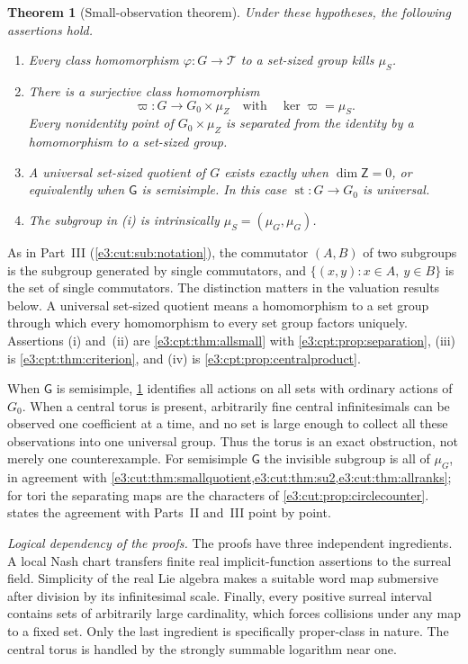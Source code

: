 \documentclass[11pt,letterpaper]{article}
\numberwithin{equation}{section}
\newtheorem{theorem}{Theorem}[section]
\theoremstyle{definition}
\theoremstyle{remark}
\newcommand{\st}{\operatorname{st}}
\newcommand{\comm}[2]{\left(#1,#2\right)}
\newcommand{\commset}[2]{\{\comm{x}{y}:x\in #1,\ y\in #2\}}
\newcommand{\sG}{\mathsf G}
\newcommand{\sZ}{\mathsf Z}
\begin{document}
\begin{theorem}[Small-observation theorem]\label{e3:cpt:thm:main-intro}
Under these hypotheses, the following assertions hold.
\begin{enumerate}[label=\textup{(\roman*)}]
\item Every class homomorphism $\varphi:G\to\mathcal T$ to a set-sized group
kills $\mu_S$.
\item There is a surjective class homomorphism
\[
 \varpi:G\longrightarrow G_0\times\mu_Z
 \quad\text{with}\quad \ker\varpi=\mu_S.
\]
Every nonidentity point of $G_0\times\mu_Z$ is separated from the identity
by a homomorphism to a set-sized group.
\item A universal set-sized quotient of $G$ exists exactly when
$\dim\sZ=0$, or equivalently when $\sG$ is semisimple. In this case
$\st:G\to G_0$ is universal.
\item The subgroup in \textup{(i)} is intrinsically
$\mu_S=\comm{\mu_G}{\mu_G}$.
\end{enumerate}
\end{theorem}

As in Part~III (\cref{e3:cut:sub:notation}), the commutator $\comm{A}{B}$ of
two subgroups is the subgroup generated by single commutators, and
$\commset{A}{B}$ is the set of single commutators. The distinction matters in
the valuation results below. A universal set-sized quotient means a
homomorphism to a set group through which every homomorphism to every set group
factors uniquely. Assertions (i) and~(ii) are \cref{e3:cpt:thm:allsmall} with
\cref{e3:cpt:prop:separation}, (iii) is \cref{e3:cpt:thm:criterion}, and (iv)
is \cref{e3:cpt:prop:centralproduct}.

When $\sG$ is semisimple, \cref{e3:cpt:thm:main-intro} identifies all actions on
all sets with ordinary actions of $G_0$. When a central torus is present,
arbitrarily fine central infinitesimals can be observed one coefficient at a
time, and no set is large enough to collect all these observations into one
universal group. Thus the torus is an exact obstruction, not merely one
counterexample. For semisimple $\sG$ the invisible subgroup is all of $\mu_G$,
in agreement with \cref{e3:cut:thm:smallquotient,e3:cut:thm:su2,e3:cut:thm:allranks};
for tori the separating maps are the characters of
\cref{e3:cut:prop:circlecounter}.  states the
agreement with Parts~II and~III point by point.

\emph{Logical dependency of the proofs.} The proofs have three independent
ingredients. A local Nash chart transfers finite real implicit-function
assertions to the surreal field. Simplicity of the real Lie algebra makes a
suitable word map submersive after division by its infinitesimal scale.
Finally, every positive surreal interval contains sets of arbitrarily large
cardinality, which forces collisions under any map to a fixed set. Only the last
ingredient is specifically proper-class in nature. The central torus is handled
by the strongly summable logarithm near one.
\end{document}
